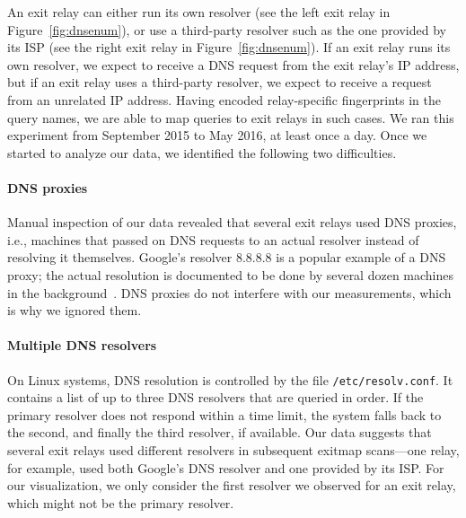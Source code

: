 An exit relay can either run its own resolver (see the left exit relay in
Figure~\ref{fig:dnsenum}), or use a third-party resolver such as the one
provided by its ISP (see the right exit relay in Figure~\ref{fig:dnsenum}).  If
an exit relay runs its own resolver, we expect to receive a DNS request from
the exit relay's IP address, but if an exit relay uses a third-party resolver,
we expect to receive a request from an unrelated IP address.  Having encoded
relay-specific fingerprints in the query names, we are able to map queries to
exit relays in such cases.  We ran this experiment from September 2015 to May
2016, at least once a day.  Once we started to analyze our data, we identified
the following two difficulties.

\paragraph{DNS proxies}
Manual inspection of our data revealed that several exit relays used DNS
proxies, i.e., machines that passed on DNS requests to an actual resolver
instead of resolving it themselves.  Google's resolver 8.8.8.8 is a popular
example of a DNS proxy; the actual resolution is documented to be done by
several dozen machines in the background~\cite{google-proxies}.  DNS proxies do
not interfere with our measurements, which is why we ignored them.

\paragraph{Multiple DNS resolvers}
On Linux systems, DNS resolution is controlled by the file
\texttt{/etc/resolv.conf}.  It contains a list of up to three DNS resolvers
that are queried in order.  If the primary resolver does not respond within a
time limit, the system falls back to the second, and finally the third
resolver, if available.  Our data suggests that several exit relays used
different resolvers in subsequent exitmap scans---one relay, for example, used
both Google's DNS resolver and one provided by its ISP.  For our visualization,
we only consider the first resolver we observed for an exit relay, which might
not be the primary resolver.

